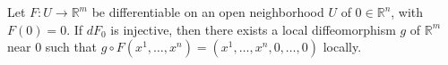 Let $F: U \to \mathbb{R}^m$ be differentiable on an open neighborhood $U$ of $0 \in \mathbb{R}^n$, with $F(0) = 0$. If $dF_0$ is injective, then there exists a local diffeomorphism $g$ of $\mathbb{R}^m$ near $0$ such that $g \circ F(x^1, \ldots, x^n) = (x^1, \ldots, x^n, 0, \ldots, 0)$ locally.